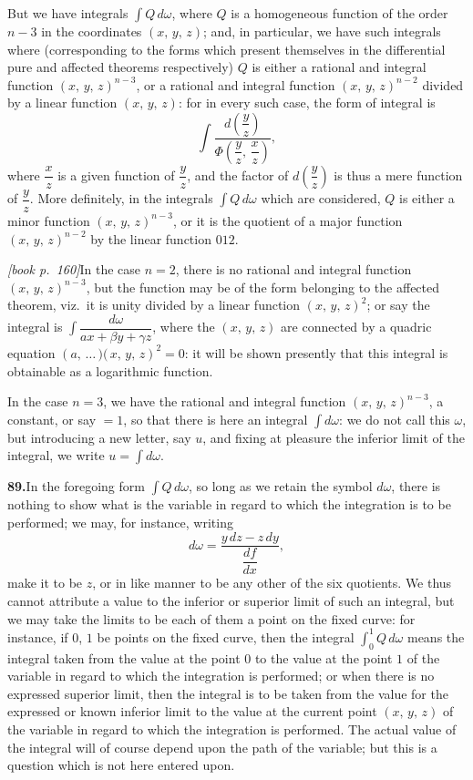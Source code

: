 \documentclass[11pt,a4paper]{article}
\begin{document}
But we have integrals $\int Q\,d\omega$, where $Q$ is a homogeneous function of the order $n - 3$ in the coordinates $(x,\,y,\,z)$; and, in particular, we have such integrals where (corresponding to the forms which present themselves in the differential pure and affected theorems respectively) $Q$ is either a rational and integral function $(x,\,y,\,z)^{n-3}$, or a rational and integral function $(x,\,y,\,z)^{n-2}$ divided by a linear function $(x,\,y,\,z)$: for in every such case, the form of integral is
\[
\int\frac{d\!\left(\dfrac{y}{z}\right)}{\Phi\!\left(\dfrac{y}{z},\,\dfrac{x}{z}\right)},
\]
where $\dfrac{x}{z}$ is a given function of $\dfrac{y}{z}$, and the factor of $d\!\left(\dfrac{y}{z}\right)$ is thus a mere function of $\dfrac{y}{z}$. More definitely, in the integrals $\int Q\,d\omega$ which are considered, $Q$ is either a minor function $(x,\,y,\,z)^{n-3}$, or it is the quotient of a major function $(x,\,y,\,z)^{n-2}$ by the linear function $012$.

\medskip\noindent\textit{[book p.~160]}\quad In the case $n = 2$, there is no rational and integral function $(x,\,y,\,z)^{n-3}$, but the function may be of the form belonging to the affected theorem, viz.\ it is unity divided by a linear function $(x,\,y,\,z)^2$; or say the integral is $\int\dfrac{d\omega}{ax + \beta y + \gamma z}$, where the $(x,\,y,\,z)$ are connected by a quadric equation $(a,\,\ldots\!\,\mbox{$)\!($}\,x,\,y,\,z)^2 = 0$: it will be shown presently that this integral is obtainable as a logarithmic function.

In the case $n = 3$, we have the rational and integral function $(x,\,y,\,z)^{n-3}$, a constant, or say $= 1$, so that there is here an integral $\int d\omega$: we do not call this $\omega$, but introducing a new letter, say $u$, and fixing at pleasure the inferior limit of the integral, we write $u = \int d\omega$.

\medskip\noindent\textbf{89.}\quad In the foregoing form $\int Q\,d\omega$, so long as we retain the symbol $d\omega$, there is nothing to show what is the variable in regard to which the integration is to be performed; we may, for instance, writing
\[
d\omega = \frac{y\,dz - z\,dy}{\dfrac{df}{dx}},
\]
make it to be $z$, or in like manner to be any other of the six quotients. We thus cannot attribute a value to the inferior or superior limit of such an integral, but we may take the limits to be each of them a point on the fixed curve: for instance, if $0$, $1$ be points on the fixed curve, then the integral $\displaystyle\int_0^1 Q\,d\omega$ means the integral taken from the value at the point $0$ to the value at the point $1$ of the variable in regard to which the integration is performed; or when there is no expressed superior limit, then the integral is to be taken from the value for the expressed or known inferior limit to the value at the current point $(x,\,y,\,z)$ of the variable in regard to which the integration is performed. The actual value of the integral will of course depend upon the path of the variable; but this is a question which is not here entered upon.
\end{document}
